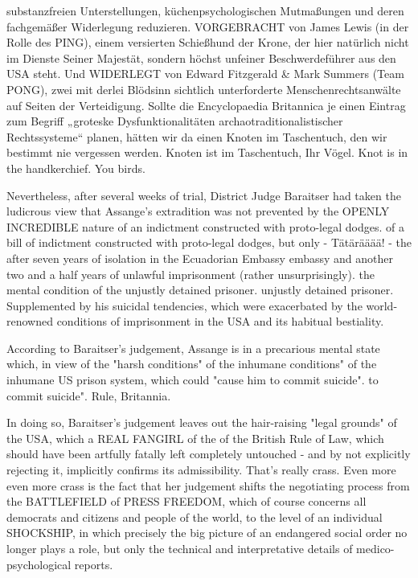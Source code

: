 \begin{multicols}{2}
{substanzfreien Unterstellungen, küchenpsychologischen Mutmaßungen und deren fachgemäßer Widerlegung reduzieren. VORGEBRACHT von James Lewis (in
der Rolle des PING), einem versierten Schießhund der
Krone, der hier natürlich nicht im Dienste Seiner Majestät, sondern höchst unfeiner Beschwerdeführer aus den
USA steht. Und WIDERLEGT von Edward Fitzgerald \&
Mark Summers (Team PONG), zwei mit derlei Blödsinn
sichtlich unterforderte Menschenrechtsanwälte auf Seiten der Verteidigung.
\textCR
Sollte die Encyclopaedia Britannica je einen Eintrag zum
Begriff „groteske Dysfunktionalitäten archaotraditionalistischer Rechtssysteme“ planen, hätten wir da einen
Knoten im Taschentuch, den wir bestimmt nie vergessen
werden. Knoten ist im Taschentuch, Ihr Vögel. Knot is in
the handkerchief. You birds.}

Nevertheless, after several weeks of trial, District Judge Baraitser had taken the ludicrous view that Assange's extradition was not prevented by the OPENLY INCREDIBLE nature of an indictment constructed with proto-legal dodges.
of a bill of indictment constructed with proto-legal dodges, but only - Tätärääää! - the
after seven years of isolation in the Ecuadorian Embassy
embassy and another two and a half years of unlawful imprisonment (rather unsurprisingly).
the mental condition of the unjustly detained prisoner.
unjustly detained prisoner. Supplemented by his
suicidal tendencies, which were exacerbated by the world-renowned
conditions of imprisonment in the USA
and its habitual bestiality.

According to Baraitser's judgement, Assange is in a precarious mental state which, in view of the "harsh conditions" of the inhumane
conditions" of the inhumane US prison system, which could "cause him to commit suicide".
to commit suicide". Rule, Britannia.

In doing so, Baraitser's judgement leaves out the hair-raising
"legal grounds" of the USA, which a REAL FANGIRL of the
of the British Rule of Law, which should have been artfully
fatally left completely untouched - and
by not explicitly rejecting it, implicitly confirms its admissibility. That's really crass. Even more
even more crass is the fact that her judgement shifts the negotiating process from the BATTLEFIELD of PRESS FREEDOM, which of course concerns all democrats and citizens
and people of the world, to the level of an individual SHOCKSHIP,
in which precisely the big picture of an endangered social order no longer plays a role, but only the technical and interpretative details of medico-psychological reports.


\end{multicols}
